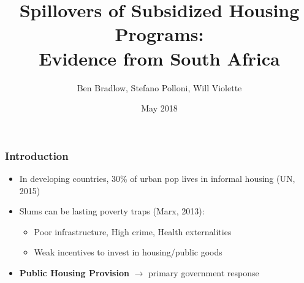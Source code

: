 \documentclass[aspectratio=149]{beamer}
\title{Spillovers of Subsidized Housing Programs: \\ Evidence from South Africa } %
\author{Ben Bradlow, Stefano Polloni, Will Violette}
\date{May 2018} %
\begin{document}
\beamertemplatenavigationsymbolsempty

\begin{frame}
\titlepage %
\end{frame}



\begin{frame}
\frametitle{Introduction}
\centering

\begin{itemize}
  \item<1-> In developing countries, 30\% of urban pop lives in informal housing (UN, 2015)
  \vspace{2mm}
  \item<2-> Slums can be lasting poverty traps (Marx, 2013): 
    \begin{itemize}
      \vspace{1mm}
      \item Poor infrastructure, High crime, Health externalities
      \vspace{1mm}
      \item Weak incentives to invest in housing/public goods
  \vspace{2mm}
    \end{itemize}
  \item<3-> \textbf{Public Housing Provision} $\rightarrow$ primary government response
\end{itemize}


\end{frame}
\end{document}
